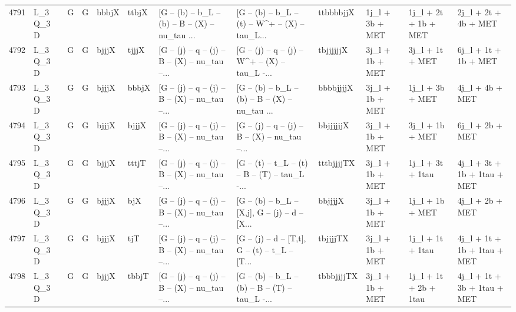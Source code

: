 \begin{tabular}{llllllllllll}
4791 &    L\_3 Q\_3 D &     G &     G &       bbbjX &       ttbjX &  [G -- (b) -- b\_L -- (b) -- B -- (X) -- nu\_tau ... &  [G -- (b) -- b\_L -- (t) -- W\textasciicircum + -- (X) -- tau\_L... &   ttbbbbjjX &          1j\_l + 3b + MET &     1j\_l + 2t + 1b + MET &               2j\_l + 2t + 4b + MET \\
4792 &    L\_3 Q\_3 D &     G &     G &       bjjjX &       tjjjX &  [G -- (j) -- q -- (j) -- B -- (X) -- nu\_tau --... &  [G -- (j) -- q -- (j) -- W\textasciicircum + -- (X) -- tau\_L -... &   tbjjjjjjX &          3j\_l + 1b + MET &          3j\_l + 1t + MET &               6j\_l + 1t + 1b + MET \\
4793 &    L\_3 Q\_3 D &     G &     G &       bjjjX &       bbbjX &  [G -- (j) -- q -- (j) -- B -- (X) -- nu\_tau --... &  [G -- (b) -- b\_L -- (b) -- B -- (X) -- nu\_tau ... &   bbbbjjjjX &          3j\_l + 1b + MET &          1j\_l + 3b + MET &                    4j\_l + 4b + MET \\
4794 &    L\_3 Q\_3 D &     G &     G &       bjjjX &       bjjjX &  [G -- (j) -- q -- (j) -- B -- (X) -- nu\_tau --... &  [G -- (j) -- q -- (j) -- B -- (X) -- nu\_tau --... &   bbjjjjjjX &          3j\_l + 1b + MET &          3j\_l + 1b + MET &                    6j\_l + 2b + MET \\
4795 &    L\_3 Q\_3 D &     G &     G &       bjjjX &       tttjT &  [G -- (j) -- q -- (j) -- B -- (X) -- nu\_tau --... &  [G -- (t) -- t\_L -- (t) -- B -- (T) -- tau\_L -... &  tttbjjjjTX &          3j\_l + 1b + MET &         1j\_l + 3t + 1tau &        4j\_l + 3t + 1b + 1tau + MET \\
4796 &    L\_3 Q\_3 D &     G &     G &       bjjjX &         bjX &  [G -- (j) -- q -- (j) -- B -- (X) -- nu\_tau --... &  [G -- (b) -- b\_L -- [X,j], G -- (j) -- d -- [X... &     bbjjjjX &          3j\_l + 1b + MET &          1j\_l + 1b + MET &                    4j\_l + 2b + MET \\
4797 &    L\_3 Q\_3 D &     G &     G &       bjjjX &         tjT &  [G -- (j) -- q -- (j) -- B -- (X) -- nu\_tau --... &  [G -- (j) -- d -- [T,t], G -- (t) -- t\_L -- [T... &    tbjjjjTX &          3j\_l + 1b + MET &         1j\_l + 1t + 1tau &        4j\_l + 1t + 1b + 1tau + MET \\
4798 &    L\_3 Q\_3 D &     G &     G &       bjjjX &       tbbjT &  [G -- (j) -- q -- (j) -- B -- (X) -- nu\_tau --... &  [G -- (b) -- b\_L -- (b) -- B -- (T) -- tau\_L -... &  tbbbjjjjTX &          3j\_l + 1b + MET &    1j\_l + 1t + 2b + 1tau &        4j\_l + 1t + 3b + 1tau + MET \\

\end{tabular}
